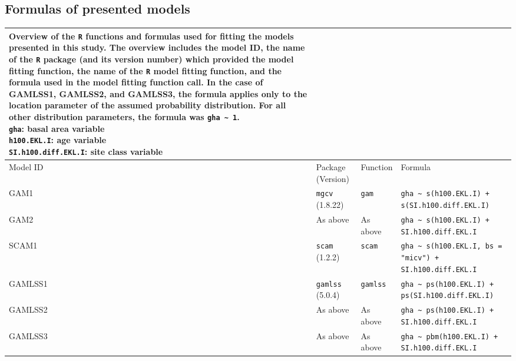 \subsection{Formulas of presented models}

\begin{table}[H]
  {\tabulinesep=2mm
    \begin{longtabu}{l l l L}
      \caption{Overview of the \texttt{R} functions and formulas used for fitting the models presented in this study. The overview includes
        the model ID,
        the name of the \texttt{R} package (and its version number) which provided the model fitting function,
        the name of the \texttt{R} model fitting function,
        and the formula used in the model fitting function call.
        In the case of GAMLSS1, GAMLSS2, and GAMLSS3, the formula applies only to the location parameter of the assumed probability distribution.
        For all other distribution parameters, the formula was \texttt{gha \textasciitilde{} 1}. \\
        \texttt{gha}: basal area variable \\
        \texttt{h100.EKL.I}: age variable \\
        \texttt{SI.h100.diff.EKL.I}: site class variable
        \label{tab:PresentedModelsOverview}} \\
      \toprule
      Model ID & Package (Version) & Function & Formula \\
      \midrule
      \endhead
      \bottomrule
      \endlastfoot
      GAM1 & \texttt{mgcv} (1.8.22) & \texttt{gam} & \texttt{gha \textasciitilde{} s(h100.EKL.I) + s(SI.h100.diff.EKL.I)} \\
      GAM2 & As above & As above & \texttt{gha \textasciitilde{} s(h100.EKL.I) + SI.h100.diff.EKL.I} \\
      SCAM1 & \texttt{scam} (1.2.2) & \texttt{scam} & \texttt{gha \textasciitilde{} s(h100.EKL.I, bs = "micv") + SI.h100.diff.EKL.I} \\
      GAMLSS1 & \texttt{gamlss} (5.0.4) & \texttt{gamlss} & \texttt{gha \textasciitilde{} ps(h100.EKL.I) + ps(SI.h100.diff.EKL.I)} \\
      GAMLSS2 & As above & As above & \texttt{gha \textasciitilde{} ps(h100.EKL.I) + SI.h100.diff.EKL.I} \\
      GAMLSS3 & As above & As above & \texttt{gha \textasciitilde{} pbm(h100.EKL.I) + SI.h100.diff.EKL.I} \\
      \bottomrule
    \end{longtabu}}
\end{table}


